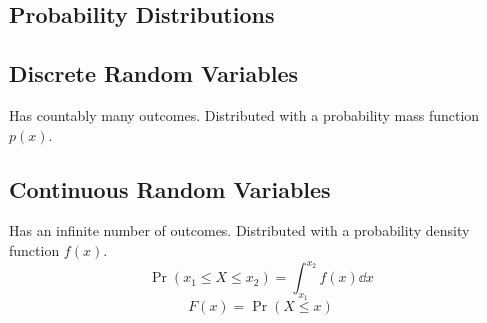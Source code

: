 \documentclass{article}
\begin{document}
\begin{minipage}{126.1962963mm}
    \begin{multicols}{2}
        \section*{Probability Distributions}
        \subsection*{Discrete Random Variables}
        Has countably many outcomes. Distributed with a
        probability mass function \(p(x)\).
        \subsection*{Continuous Random Variables}
        Has an infinite number of outcomes. Distributed with a
        probability density function \(f(x)\).
        \begin{equation*}
            \Pr{\left( x_1 \leq X \leq x_2 \right)} = \int_{x_1}^{x_2} f(x) \dd{x}
        \end{equation*}
        \begin{equation*}
            F(x) = \Pr{\left( X \leq x \right)}
        \end{equation*}

\end{multicols}
\end{minipage}
\end{document}
